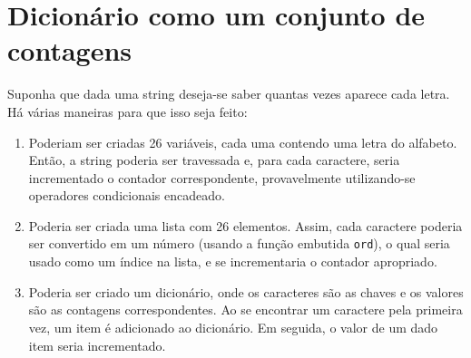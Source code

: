 \section{Dicionário como um conjunto de contagens}
\label{histogram}


Suponha que dada uma string deseja-se saber quantas vezes aparece cada letra. Há várias maneiras para que isso seja feito:

\begin{enumerate}

\item Poderiam ser criadas 26 variáveis, cada uma contendo uma letra do alfabeto. Então, a string poderia ser travessada e, para cada caractere, seria incrementado o contador correspondente, provavelmente utilizando-se operadores condicionais encadeado.

\item Poderia ser criada uma lista com 26 elementos. Assim, cada caractere poderia ser convertido em um número (usando a função embutida {\tt ord}), o qual seria usado como um índice na lista, e se incrementaria o contador apropriado.

\item Poderia ser criado um dicionário, onde os caracteres são as chaves e os valores são as contagens correspondentes. Ao se encontrar um caractere pela primeira vez, um item é adicionado ao dicionário. Em seguida, o valor de um dado item seria incrementado.

\end{enumerate}


